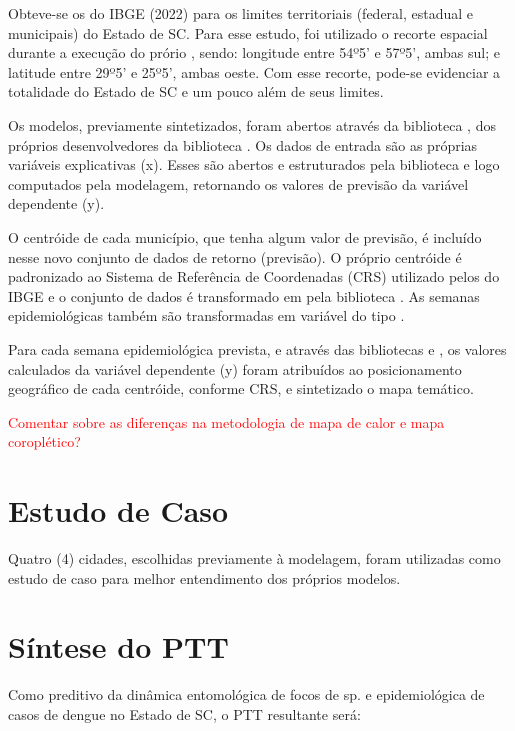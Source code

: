 \indent Obteve-se os  do \acrshort{IBGE} (2022) para os limites territoriais (federal, estadual e municipais) do Estado de \acrlong{SC}. Para esse estudo, foi utilizado o recorte espacial durante a execução do prório , sendo: longitude entre 54º5' e 57º5', ambas sul; e latitude entre 29º5' e 25º5', ambas oeste. Com esse recorte, pode-se evidenciar a totalidade do Estado de \acrlong{SC} e um pouco além de seus limites.

\indent Os modelos, previamente sintetizados, foram abertos através da biblioteca , dos próprios desenvolvedores da biblioteca . Os dados de entrada são as próprias variáveis explicativas (x). Esses são abertos e estruturados pela biblioteca  e logo computados pela modelagem, retornando os valores de previsão da variável dependente (y).

\indent O centróide de cada município, que tenha algum valor de previsão, é incluído nesse novo conjunto de dados de retorno (previsão). O próprio centróide é padronizado ao Sistema de Referência de Coordenadas (\acrfull{CRS}) utilizado pelos  do \acrshort{IBGE} e o conjunto  de dados é transformado em  pela biblioteca . As semanas epidemiológicas também são transformadas em variável do tipo .

\indent Para cada semana epidemiológica prevista, e através das bibliotecas  e , os valores calculados da variável dependente (y) foram atribuídos ao posicionamento geográfico de cada centróide, conforme \acrshort{CRS}, e sintetizado o mapa temático.

\textcolor{red}{Comentar sobre as diferenças na metodologia de mapa de calor e mapa coroplético?}
 
\section{Estudo de Caso}

\indent Quatro (4) cidades, escolhidas previamente à modelagem, foram utilizadas como estudo de caso para melhor entendimento dos próprios modelos.

\section{Síntese do \acrfull{PTT}} 

\indent Como preditivo da dinâmica entomológica de focos de  sp. e epidemiológica de casos de dengue no Estado de \acrlong{SC}, o \acrshort{PTT} resultante será:

